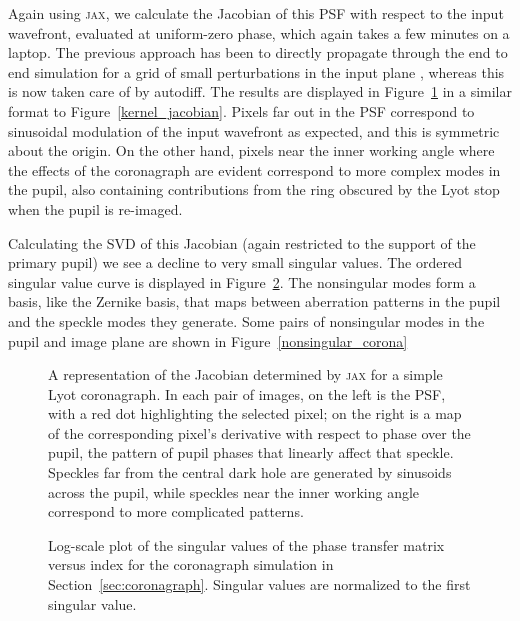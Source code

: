 \documentclass[modern]{aastex63}
\begin{document}
Again using \textsc{jax}, we calculate the Jacobian of this PSF with respect to the input wavefront, evaluated at uniform-zero phase, which again takes a few minutes on a laptop. The previous approach has been to directly propagate through the end to end simulation for a grid of small perturbations in the input plane \citep{falco}, whereas this is now taken care of by autodiff. The results are displayed in Figure~\ref{speckle_jacobian} in a similar format to Figure~\ref{kernel_jacobian}. Pixels far out in the PSF correspond to sinusoidal modulation of the input wavefront as expected, and this is symmetric about the origin. On the other hand, pixels near the inner working angle where the effects of the coronagraph are evident correspond to more complex modes in the pupil, also containing contributions from the ring obscured by the Lyot stop when the pupil is re-imaged. 

Calculating the SVD of this Jacobian (again restricted to the support of the primary pupil) we see a decline to very small singular values. The ordered singular value curve is displayed in Figure~\ref{fig:svd_coronagraph}. The nonsingular modes form a basis, like the Zernike basis, that maps between aberration patterns in the pupil and the speckle modes they generate. Some pairs of nonsingular modes in the pupil and image plane are shown in Figure~\ref{nonsingular_corona}

\begin{figure}
\caption{A representation of the Jacobian determined by \textsc{jax} for a simple Lyot coronagraph. In each pair of images, on the left is the PSF, with a red dot highlighting the selected pixel; on the right is a map of the corresponding pixel's derivative with respect to phase over the pupil, the pattern of pupil phases that linearly affect that speckle. Speckles far from the central dark hole are generated by sinusoids across the pupil, while speckles near the inner working angle correspond to more complicated patterns.  \href{https://github.com/benjaminpope/morphine/blob/stable/notebooks/morphine_coronagraph.ipynb}{\color{linkcolor}\faGithub}
\label{speckle_jacobian}}
\end{figure}


\begin{figure}
     \caption{Log-scale plot of the singular values of the phase transfer matrix versus index for the coronagraph simulation in Section~\ref{sec:coronagraph}. Singular values are normalized to the first singular value. \href{https://github.com/benjaminpope/morphine/blob/stable/notebooks/morphine_coronagraph.ipynb}{\color{linkcolor}\faGithub}}
    \label{fig:svd_coronagraph}
\end{figure}
\end{document}
